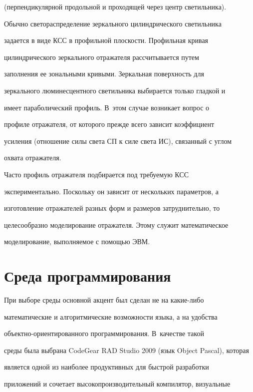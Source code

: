 (перпендикулярной продольной и проходящей через центр светильника). 


Обычно светораспределение зеркального цилиндрического светильника 


задается в виде КСС в профильной плоскости. Профильная кривая 


цилиндрического зеркального отражателя рассчитывается путем 


заполнения ее зональными кривыми. Зеркальная поверхность для 


зеркального люминесцентного светильника выбирается только гладкой и 


имеет параболический профиль. В~этом случае возникает вопрос о 


профиле отражателя, от которого прежде всего зависит коэффициент 


усиления (отношение силы света СП к силе света ИС), связанный с углом 


охвата отражателя.


  


  Часто профиль отражателя подбирается под требуемую КСС 


экспериментально. Поскольку он зависит от нескольких параметров, а 


изготовление отражателей разных форм и размеров затруднительно, то 


целесообразно моделирование отражателя. Этому служит математическое 


моделирование, выполняемое с помощью ЭВМ.





\section{Среда программирования}


     


     При выборе среды основной акцент был сделан не на какие-либо 


математические и алгоритмические возможности языка, а на удобства 


объект\-но-ори\-ен\-ти\-ро\-ван\-но\-го программирования. В~качестве такой 


среды была выбрана CodeGear RAD Studio 2009 (язык Object Pascal), которая 


является одной из наиболее продуктивных для быстрой разработки 


приложений и сочетает высокопроизводительный компилятор, визуальные 


